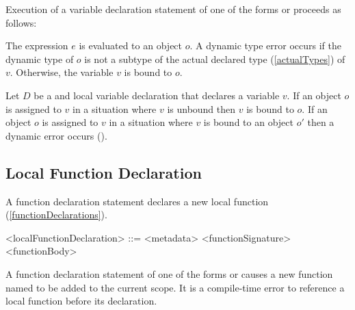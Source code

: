 \documentclass[makeidx]{article}
\begin{document}
{

\LMHash{}%
Execution of a variable declaration statement of one of the forms
 or
proceeds as follows:

\LMHash{}%
The expression $e$ is evaluated to an object $o$.
A dynamic type error occurs
if the dynamic type of $o$ is not a subtype of the actual declared type
(\ref{actualTypes})
of $v$.
Otherwise, the variable $v$ is bound to $o$.


\LMHash{}%
Let $D$ be a \LATE{} and \FINAL{} local variable declaration
that declares a variable $v$.
If an object $o$ is assigned to $v$
in a situation where $v$ is unbound
then $v$ is bound to $o$.
If an object $o$ is assigned to $v$
in a situation where $v$ is bound to an object $o'$
then a dynamic error occurs
().


\subsection{Local Function Declaration}

\LMHash{}%
A function declaration statement declares a new local function
(\ref{functionDeclarations}).

\begin{grammar}
<localFunctionDeclaration> ::= <metadata> <functionSignature> <functionBody>
\end{grammar}

\LMHash{}%
A function declaration statement of one of the forms
or
causes a new function named \id{} to be added to the current scope.
It is a compile-time error to reference a local function before its declaration.

}
\end{document}
